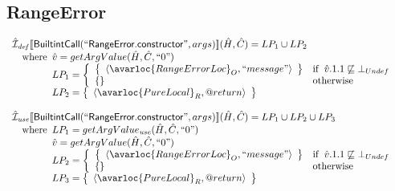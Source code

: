 \subsection{RangeError}
\[
\begin{array}{l}

\aI_{\it def}\lbr \SF{BuiltintCall}(``\SF{RangeError.constructor}",args)\rbr(\hat{H},\hat{C})
  = LP_1 \cup LP_2\\
\quad\wherec{
  \hat{v} = getArgValue(\hat{H}, \hat{C}, ``0")\\
  LP_1 = \left\{\begin{array}{ll}
  \set{\langle\avarloc{RangeErrorLoc}_O, ``message"\rangle} & \ifc{\hat{v}.1.1 \not\sqsubseteq \bot_{Undef}}\\
  \set{} & \owc\\
    \end{array}\right.\\
  LP_2 = \set{\langle\avarloc{PureLocal}_R,\varprop{return}\rangle}\\
  }\\
\\


\aI_{\it use}\lbr \SF{BuiltintCall}(``\SF{RangeError.constructor}",args)\rbr(\hat{H},\hat{C})
  = LP_1 \cup LP_2 \cup LP_3\\
\quad\wherec{
  LP_1 = getArgValue_{\it use}(\hat{H}, \hat{C}, ``0")\\
  \hat{v} = getArgValue(\hat{H}, \hat{C}, ``0")\\
  LP_2 = \left\{\begin{array}{ll}
  \set{\langle\avarloc{RangeErrorLoc}_O, ``message"\rangle} & \ifc{\hat{v}.1.1 \not\sqsubseteq \bot_{Undef}}\\
  \set{} & \owc\\
    \end{array}\right.\\
  LP_3 = \set{\langle\avarloc{PureLocal}_R,\varprop{return}\rangle}\\
  }\\
\\

\end{array}
\]


